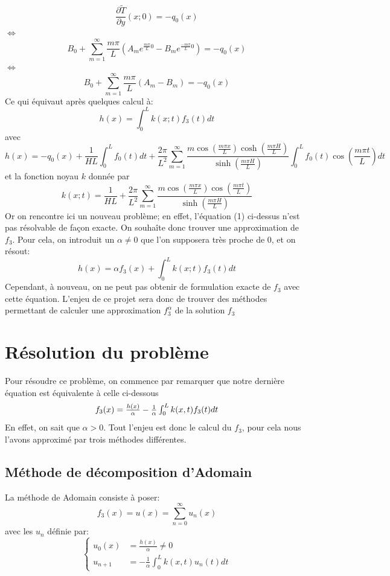\documentclass{article}
\begin{document}
\[
\frac{\partial\tilde{T}}{\partial y}(x;0)=-q_0(x)
\]
$\Longleftrightarrow$
\[
B_0+\sum_{m=1}^{\infty}\frac{m\pi}{L}\left( A_me^{\frac{m\pi}{L}0}-B_me^{\frac{-m\pi}{L}0}\right)=-q_0(x)
\]
$\Longleftrightarrow$
\[
B_0+\sum_{m=1}^{\infty}\frac{m\pi}{L}\left( A_m-B_m\right)=-q_0(x)
\]
Ce qui équivaut après quelques calcul à:
\[
\begin{equation}
    h(x)=\int_0^Lk(x;t)f_3(t)dt
\end{equation}
\]
avec
\[
h(x)=-q_0(x)+\frac{1}{HL}\int_0^Lf_0(t)dt+\frac{2\pi}{L^2}\sum_{m=1}^{\infty}\frac{m\cos \left(\frac{m\pi x}{L}\right)\cosh\left(\frac{m\pi H}{L}\right)}{\sinh\left(\frac{m\pi H}{L}\right)}\int_0^Lf_0(t)\cos\left(\frac{m\pi t}{L}\right)dt
\]
et la fonction noyau $k$ donnée par 
\[
k(x;t)=\frac{1}{HL}+\frac{2\pi}{L^2}\sum_{m=1}^\infty\frac{m\cos \left(\frac{m\pi x}{L}\right)\cos\left(\frac{m\pi t}{L}\right)}{\sinh\left(\frac{m\pi H}{L}\right)}
\]
Or on rencontre ici un nouveau problème; en effet, l'équation (1) ci-dessus n'est pas résolvable de façon exacte. On souhaîte donc trouver une approximation de $f_3$. Pour cela, on introduit un $\alpha\neq 0$ que l'on supposera très proche de 0, et on résout:
\[
\begin{equation}
    h(x)=\alpha f_3(x)+\int_0^Lk(x;t)f_3(t)dt
\end{equation}
\]
Cependant, à nouveau, on ne peut pas obtenir de formulation exacte de $f_3$ avec cette équation. L'enjeu de ce projet sera donc de trouver des méthodes permettant de calculer une approximation $f_3^\alpha$ de la solution $f_3$
\section{Résolution du problème}
Pour résoudre ce problème, on commence par remarquer que notre dernière équation est équivalente à celle ci-dessous
\[
$$f_3(x)=\frac{h(x)}{\alpha}-\frac{1}{\alpha}\int_0^L k(x,t)f_3(t)dt$$
\]
En effet, on sait que $\alpha>0$.
Tout l'enjeu est donc le calcul du $f_3$, pour cela nous l'avons approximé par trois méthodes différentes.\\
\subsection{Méthode de décomposition d'Adomain}
La méthode de Adomain consiste à poser:
$$f_3(x)=u(x)=\sum_{n=0}^{\infty}u_n(x)$$
avec les $u_n$ définie par:
$$
\left\{
    \begin{array}{ll}
        u_0(x) &= \frac{h(x)}{\alpha} \neq 0 \\
         u_{n+1} &= -\frac{1}{\alpha}\displaystyle\int_{0}^{L}k(x,t)u_n(t)dt
    \end{array}
\right.
$$
\end{document}
